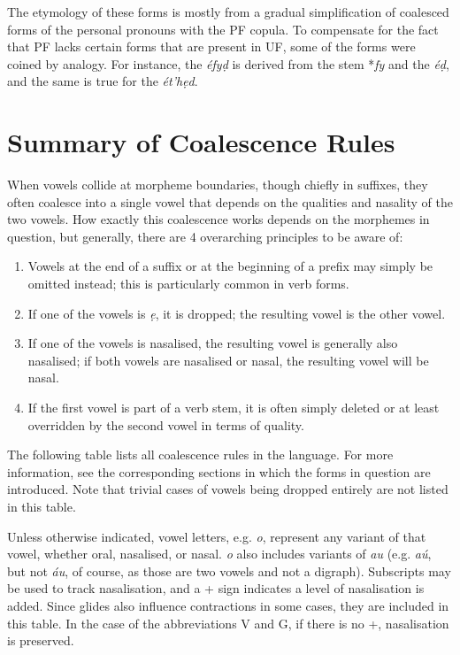 \documentclass[a4paper, 12pt, twoside, openright, final]{book}
\let \w \textit
\begin{document}
The etymology of these forms is mostly from a gradual simplification of coalesced forms of the personal
pronouns with the PF copula. To compensate for the fact that PF lacks certain forms that are present in UF, some
of the forms were coined by analogy. For instance, the  \w{éfyḍ} is derived from the 
stem *\w{fy} and the  \w{éḍ}, and the same is true for the  \w{ét’hẹd}.

\section{Summary of Coalescence Rules}
When vowels collide at morpheme boundaries, though chiefly in suffixes, they often coalesce into a
single vowel that depends on the qualities and nasality of the two vowels. How exactly this coalescence
works depends on the morphemes in question, but generally, there are 4 overarching principles to be
aware of:
\begin{enumerate}
\item Vowels at the end of a suffix or at the beginning of a prefix may simply be omitted instead;
      this is particularly common in verb forms.
\item If one of the vowels is \w{ẹ}, it is dropped; the resulting vowel is the other vowel.
\item If one of the vowels is nasalised, the resulting vowel is generally also nasalised; if both
      vowels are nasalised or nasal, the resulting vowel will be nasal.
\item If the first vowel is part of a verb stem, it is often simply deleted or at least overridden
      by the second vowel in terms of quality.
\end{enumerate}

\noindent The following table lists all coalescence rules in the language. For more information, see the corresponding
sections in which the forms in question are introduced. Note that trivial cases of vowels being dropped entirely
are not listed in this table.

Unless otherwise indicated, vowel letters, e.g. \w{o}, represent any variant of that vowel, whether oral, nasalised, or nasal.
\w{o} also includes variants of \w{au} (e.g. \w{aú}, but not \w{áu}, of course, as those are two vowels and not a digraph).
Subscripts may be used to track nasalisation, and a + sign indicates a level of nasalisation is added. Since glides also
influence contractions in some cases, they are included in this table. In the case of the abbreviations V and G, if there
is no +, nasalisation is preserved.
\end{document}
